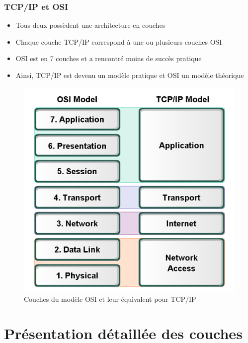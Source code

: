 \documentclass{beamer}
\begin{document}
\begin{frame}[allowframebreaks]
  \frametitle{TCP/IP et OSI}

    \begin{itemize}
      \item Tous deux possèdent une architecture en couches
      \item Chaque couche TCP/IP correspond à une ou plusieurs couches OSI 
      \item OSI est en 7 couches et a rencontré moins de succès pratique 
      \item Ainsi, TCP/IP est devenu un modèle pratique et OSI un modèle théorique
    \end{itemize}
    \begin{figure}
        \centering
        \includegraphics[scale=0.6]{1-OSI-TCPIP}
        \caption{Couches du modèle OSI et leur équivalent pour TCP/IP}
    \end{figure}

\end{frame}

\section{Présentation détaillée des couches}
\end{document}
